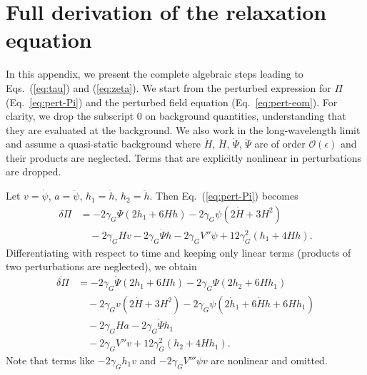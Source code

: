 \documentclass[aps,prd,reprint,superscriptaddress,floatfix]{revtex4-2}
\begin{document}
\appendix

\section{Full derivation of the relaxation equation}
\label{app:full}

In this appendix, we present the complete algebraic steps leading to Eqs.~(\ref{eq:tau}) and (\ref{eq:zeta}). We start from the perturbed expression for $\Pi$ (Eq.~\ref{eq:pert-Pi}) and the perturbed field equation (Eq.~\ref{eq:pert-eom}). For clarity, we drop the subscript $0$ on background quantities, understanding that they are evaluated at the background. We also work in the long-wavelength limit and assume a quasi-static background where $\dot H$, $\ddot H$, $\dot\Psi$, $\ddot\Psi$ are of order $\mathcal{O}(\epsilon)$ and their products are neglected. Terms that are explicitly nonlinear in perturbations are dropped.

Let $v = \dot\psi$, $a = \ddot\psi$, $h_1 = \dot h$, $h_2 = \ddot h$. Then Eq.~(\ref{eq:pert-Pi}) becomes
\begin{align}
\delta\Pi &= -2\gamma_G\Psi(2h_1+6H h) -2\gamma_G\psi(2\dot H+3H^2) \nonumber\\
&\quad -2\gamma_G H v -2\gamma_G \dot\Psi h -2\gamma_G V'' \psi +12\gamma_G^2(h_1+4H h). \label{eq:Pi-pert}
\end{align}
Differentiating with respect to time and keeping only linear terms (products of two perturbations are neglected), we obtain
\begin{align}
\dot{\delta\Pi} &= -2\gamma_G\dot\Psi(2h_1+6H h) -2\gamma_G\Psi(2h_2+6H h_1) \nonumber\\
&\quad -2\gamma_G v(2\dot H+3H^2) -2\gamma_G\psi(2\dot h_1+6\dot H h+6H h_1) \nonumber\\
&\quad -2\gamma_G H a -2\gamma_G \dot\Psi h_1 \nonumber\\
&\quad -2\gamma_G V'' v +12\gamma_G^2(h_2+4H h_1).
\label{eq:dotPi-pert}
\end{align}
Note that terms like $-2\gamma_G h_1 v$ and $-2\gamma_G V''' \psi v$ are nonlinear and omitted.
\end{document}
